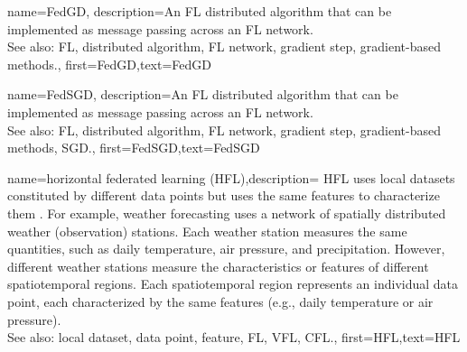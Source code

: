 {name={FedGD},
	description={An FL distributed algorithm that 
		can be implemented as message passing across an FL network. 
		\\ 
		See also: FL, distributed algorithm, FL network, gradient step, gradient-based methods.},
	first={FedGD},text={FedGD}
} 

{name={FedSGD},
	description={An FL distributed algorithm that 
		can be implemented as message passing across an FL network. 
		\\ 
		See also: FL, distributed algorithm, FL network, gradient step, gradient-based methods, SGD.},
	first={FedSGD},text={FedSGD}
} 

{name={horizontal federated learning (HFL)},description=
	{HFL uses local datasets constituted by different
	   data points but uses the same features to characterize them \cite{HFLChapter2020}.
		For example, weather forecasting uses a network of spatially distributed
		weather (observation) stations. Each weather station measures the
		same quantities, such as daily temperature, air pressure, and precipitation.
		However, different weather stations measure the characteristics or
		features of different spatiotemporal regions. Each spatiotemporal region 
		represents an individual data point, each characterized by the same features 
		(e.g., daily temperature or air pressure).\\
		See also: local dataset, data point, feature, FL, VFL, CFL.},
	first={HFL},text={HFL}
} 

